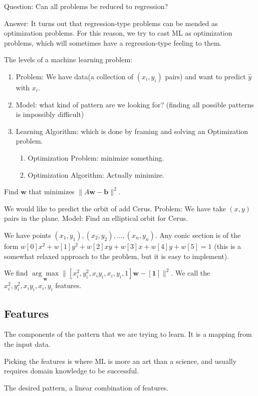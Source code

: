 \documentclass[11pt]{article}
\newcommand{\Vw}{\mathbf{w}}
\newcommand{\Vb}{\mathbf{b}}
\begin{document}
Question: Can all problems be reduced to regression?

Answer:  It turns out that regression-type problems can be mended as optimization problems.  For this reason, we try to cast ML as optimization problems, which will sometimes have a regression-type feeling to them.

The levels of a machine learning problem:
\begin{enumerate}
    \item Problem: We have data(a collection of $(x_i, y_i)$ pairs) and want to predict $\hat{y}$ with $x_i$.
    \item Model: what kind of pattern are we looking for?  (finding all possible patterns is impossibly difficult)
    \item Learning Algorithm: which is done by framing and solving an Optimization problem.
    \begin{enumerate}
        \item Optimization Problem: minimize something.
        \item Optimization Algorithm: Actually minimize.
\end{enumerate}
\end{enumerate}

\begin{definition} Find $\Vw$ that minimizes $\|A\Vw - \Vb\|^2$.
\end{definition}

\begin{example} We would like to predict the orbit of add Cerus.  Problem: We have take $(x, y)$ pairs in the plane.  
Model: Find an elliptical orbit for Cerus.  
\end{example}

We have points $(x_1, y_1), (x_2, y_2), \dots, (x_n, y_n)$.  Any conic section is of the form $w[0]x^2 + w[1]y^2 + w[2]xy + w[3]x + w[4]y + w[5] = 1$ (this is a somewhat relaxed approach to the problem, but it is easy to implement).

We find $\underset{\mathbf{w}}{\arg\max} \| [x_i^2, y_i^2, x_iy_i, x_i, y_i, 1]\Vw - [\mathbf{1}]\|^2$.   We call the $x_i^2, y_i^2, x_iy_i, x_i, y_i$ features.

\subsection{Features}
\begin{definition}[Features] The components of the pattern that we are trying to learn.  It is a mapping from the input data.
\end{definition}
Picking the features is where ML is more an art than a science, and usually requires domain knowledge to be successful.
\begin{definition} The desired pattern, a linear combination of features.
\end{definition}
\end{document}
